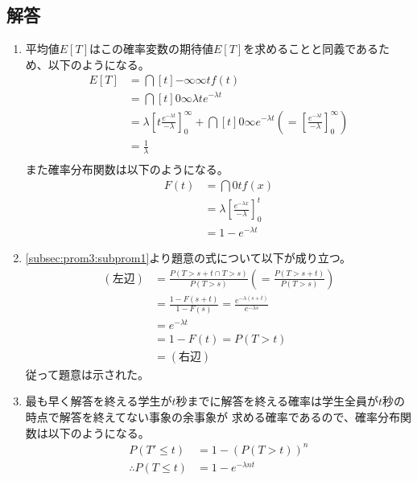 \subsection{解答}
\begin{enumerate}[(1)]
    \item 平均値$E[T]$はこの確率変数の期待値$E[T]$を求めることと同義であるため、以下のようになる。
        \begin{align*}
            E[T] 
            &= \dint[t]{-\infty}{\infty}{tf(t)}\\
            &= \dint[t]{0}{\infty}{\lambda te^{-\lambda t}}\\
            &= \lambda\left[t\frac{e^{-\lambda t}}{-\lambda}\right]_{0}^{\infty} + \dint[t]{0}{\infty}{e^{-\lambda t}}
            \left(= \left[\frac{e^{-\lambda t}}{-\lambda}\right]_{0}^{\infty}\right)\\
            &= \frac{1}{\lambda}\\
        \end{align*}
        また確率分布関数は以下のようになる。
        \begin{align*}
            F(t) 
            &= \dint{0}{t}{f(x)}\\
            &= \lambda\left[\frac{e^{-\lambda x}}{-\lambda}\right]_{0}^{t}\\
            &= 1 - e^{-\lambda t}
        \end{align*}
    \item \eqref{subsec:prom3:subprom1}より題意の式について以下が成り立つ。
        \begin{align*}
            (左辺) 
            &= \frac{P(T > s + t \cap T > s)}{P(T > s)} \left(= \frac{P(T > s + t)}{P(T > s)}\right)\\
            &= \frac{1 - F(s + t)}{1 - F(s)}
            = \frac{e^{\displaystyle -\lambda(s + t)}}{e^{\displaystyle -\lambda s}}\\
            &= e^{-\lambda t}\\
            &= 1 - F(t) = P(T > t)\\
            &= (右辺)
        \end{align*}
        従って題意は示された。
    \item 最も早く解答を終える学生が$t$秒までに解答を終える確率は学生全員が$t$秒の時点で解答を終えてない事象の余事象が
    求める確率であるので、確率分布関数は以下のようになる。
        \begin{align*}
            P(T' \leq t) &= 1 - (P(T > t))^{n}\\
            \therefore P(T \leq t) &= 1 - e^{- \lambda n t}

\end{align*}
\end{enumerate}
